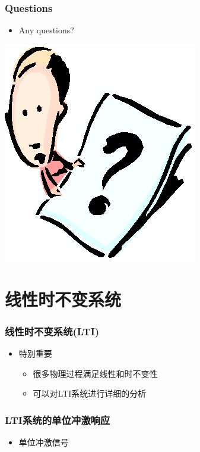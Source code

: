 \documentclass[CJKutf8,xcolor=pdftex,dvipsnames,table]{beamer}
\begin{document}
\begin{CJK*}{UTF8}{song}
  \begin{frame}
    \frametitle{Questions}
    \begin{itemize}
    \item Any questions?
    \end{itemize}
    \begin{center}
      \includegraphics[scale=.5]{question}
    \end{center}
  \end{frame}    
  
  \section{线性时不变系统}
  
  \begin{frame}
    \frametitle{线性时不变系统(LTI)}
    \begin{itemize}
    \item 特别重要
        \begin{itemize}
        \item 很多物理过程满足线性和时不变性
        \item 可以对LTI系统进行详细的分析
        \end{itemize}   
    \end{itemize} 
  \end{frame} 
  
  \begin{frame}
    \frametitle{LTI系统的单位冲激响应}
    \begin{itemize}
    \item 单位冲激信号
    

\end{itemize}
\end{frame}
\end{CJK*}
\end{document}
